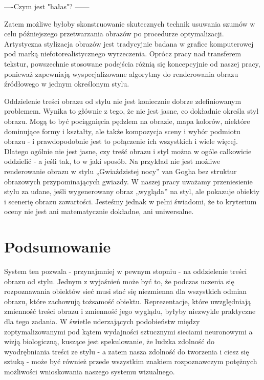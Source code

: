 \documentclass[brudnopis]{xmgr}
\begin{document}
----Czym jest "hałas"? ------

Zatem możliwe byłoby skonstruowanie skutecznych technik usuwania szumów w celu późniejszego przetwarzania obrazów po procedurze optymalizacji.
Artystyczna stylizacja obrazów jest tradycyjnie badana w grafice komputerowej pod marką niefotorealistycznego wyrzeczenia. Oprócz pracy nad transferem tekstur, powszechnie stosowane podejścia różnią się koncepcyjnie od naszej pracy, ponieważ zapewniają wyspecjalizowane algorytmy do renderowania obrazu źródłowego w jednym określonym stylu. 

Oddzielenie treści obrazu od stylu nie jest koniecznie dobrze zdefiniowanym problemem. Wynika to głównie z tego, że nie jest jasne, co dokładnie określa styl obrazu. Mogą to być pociągnięcia pędzlem na obrazie, mapa kolorów, niektóre dominujące formy i kształty, ale także kompozycja sceny i wybór podmiotu obrazu - i prawdopodobnie jest to połączenie ich wszystkich i wiele więcej. Dlatego ogólnie nie jest jasne, czy treść obrazu i styl można w ogóle całkowicie oddzielić - a jeśli tak, to w jaki sposób. Na przykład nie jest możliwe renderowanie obrazu w stylu „Gwiaździstej nocy” van Gogha bez struktur obrazowych przypominających gwiazdy. W naszej pracy uważamy przeniesienie stylu za udane, jeśli wygenerowany obraz „wygląda” na styl, ale pokazuje obiekty i scenerię obrazu zawartości. Jesteśmy jednak w pełni świadomi, że to kryterium oceny nie jest ani matematycznie dokładne, ani uniwersalne.


\section{Podsumowanie\label{s:dsssl}}

System ten pozwala - przynajmniej w pewnym stopniu - na oddzielenie treści obrazu od stylu. Jednym z wyjaśnień może być to, że podczas uczenia się rozpoznawania obiektów sieć musi stać się niezmienna dla wszystkich odmian obrazu, które zachowują tożsamość obiektu. Reprezentacje, które uwzględniają zmienność treści obrazu i zmienność jego wyglądu, byłyby niezwykle praktyczne dla tego zadania. W świetle uderzających podobieństw między zoptymalizowanymi pod kątem wydajności sztucznymi sieciami neuronowymi a wizją biologiczną, kuszące jest spekulowanie, że ludzka zdolność do wyodrębniania treści ze stylu - a zatem nasza zdolność do tworzenia i ciesz się sztuką - może być również przede wszystkim znakiem rozpoznawczym potężnych możliwości wnioskowania naszego systemu wizualnego.
\end{document}
